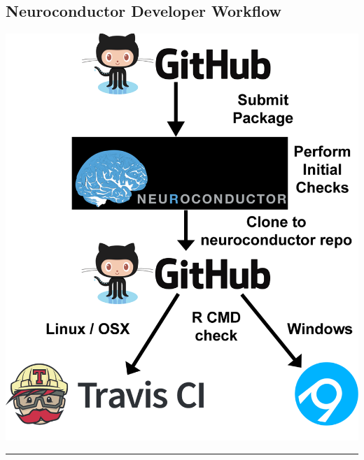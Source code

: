 \documentclass[final]{beamer}\usepackage[]{graphicx}\usepackage[]{color}
\begin{document}
\begin{frame}[fragile]
\begin{table}[!htb]
\begin{minipage}{0.40\linewidth}
\vspace*{-0.5cm}

\vfill

\end{minipage}
\begin{minipage}{0.03\linewidth}
\end{minipage}
\hfill{\vrule width 5pt}\hfill
\begin{minipage}{0.36\linewidth}



\vspace*{-0.65cm}
\section{Neuroconductor Developer Workflow}

\begin{center}
\includegraphics[width=0.8\linewidth]{neuroc_workflow.png}
\end{center}

\noindent\rule{\linewidth}{5pt}




\end{minipage}
\end{table}
\end{frame}
\end{document}
